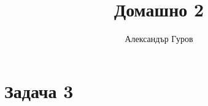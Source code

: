 \documentclass{article}
\title{Домашно 2}
\author{Александър Гуров}
\date{\datebulgarian{\today}}
\begin{document}
\maketitle
\section*{Задача 3}
\end{document}
